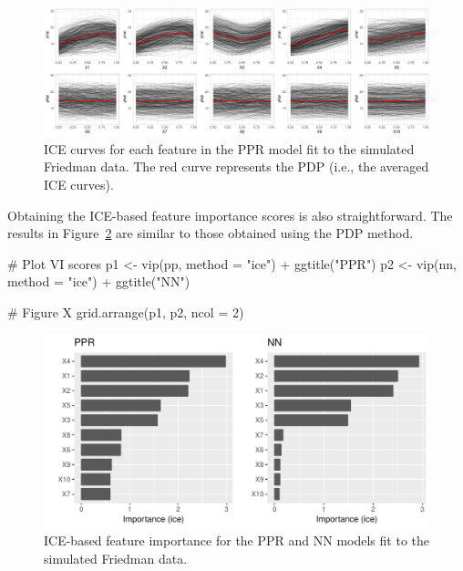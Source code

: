 
\begin{figure}[!htb]
  \centering 
  \includegraphics[width=1\linewidth]{figures/ice-ppr} 
  \caption{ICE curves for each feature in the PPR model fit to the simulated Friedman data. The red curve represents the PDP (i.e., the averaged ICE curves).}
  \label{fig:ice-ppr}
\end{figure}

Obtaining the ICE-based feature importance scores is also straightforward. The results in Figure~\ref{fig:vip-ice-ppr-nn} are similar to those obtained using the PDP method.

\begin{example}
# Plot VI scores
p1 <- vip(pp, method = "ice") + ggtitle("PPR")
p2 <- vip(nn, method = "ice") + ggtitle("NN")

# Figure X
grid.arrange(p1, p2, ncol = 2)
\end{example}

\begin{figure}[!htb]
  \centering 
  \includegraphics[width=1\linewidth]{figures/vip-ice-ppr-nn} 
  \caption{ICE-based feature importance for the PPR and NN models fit to the simulated Friedman data.}
  \label{fig:vip-ice-ppr-nn}
\end{figure}

